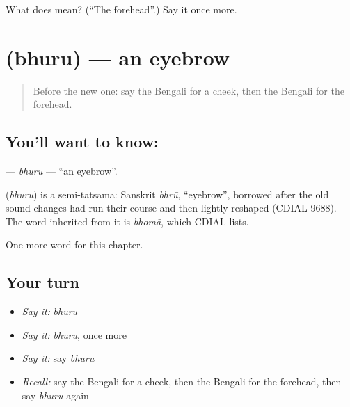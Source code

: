 \begin{tcolorbox}[breakable,colback=teal!4,colframe=teal!35!black,title={Before you move on}]
What does  mean? (\textquotedblleft{}The forehead\textquotedblright{}.) Say it once more.
\end{tcolorbox}
\section[\texorpdfstring{\bn{ভুরু} (bhuru)}{ভুরু (bhuru)}]{ (bhuru) — an eyebrow}

\label{lesson:BN-C124-bhuru}



\begin{quote}
Before the new one: say the Bengali for a cheek, then the Bengali for the forehead.
\end{quote}

\subsection*{You'll want to know: }
\textbf{} — \emph{bhuru} — \textquotedblleft{}an eyebrow\textquotedblright{}.

\begin{cousinweb}
\textbf{} (\emph{bhuru}) is a semi-tatsama: Sanskrit \emph{bhrū}, \textquotedblleft{}eyebrow\textquotedblright{}, borrowed after the old sound changes had run their course and then lightly reshaped (CDIAL 9688). The word inherited from it is \emph{bhomā}, which CDIAL lists.
\end{cousinweb}

\begin{grammarlens}[title={What you've built}]
One more word for this chapter.
\end{grammarlens}

\subsection*{Your turn}
\begin{itemize}
\raggedright
  \item \emph{Say it:} \emph{bhuru}
  \item \emph{Say it:} \emph{bhuru}, once more
  \item \emph{Say it:} say \emph{bhuru}
  \item \emph{Recall:} say the Bengali for a cheek, then the Bengali for the forehead, then say \emph{bhuru} again
\end{itemize}

